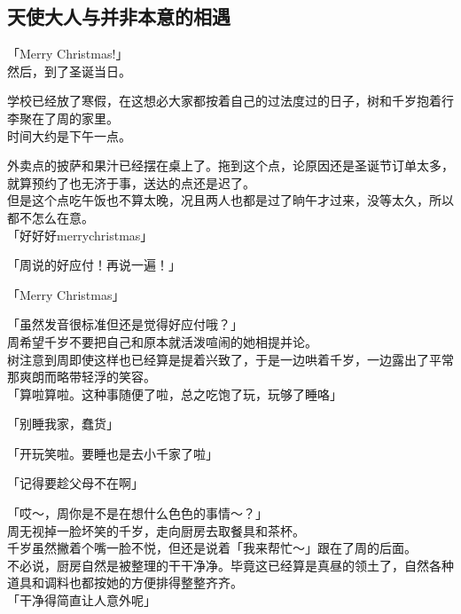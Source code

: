 \subsection{天使大人与并非本意的相遇}

「Merry Christmas!」\\

然后，到了圣诞当日。

学校已经放了寒假，在这想必大家都按着自己的过法度过的日子，树和千岁抱着行李聚在了周的家里。\\

时间大约是下午一点。

外卖点的披萨和果汁已经摆在桌上了。拖到这个点，论原因还是圣诞节订单太多，就算预约了也无济于事，送达的点还是迟了。\\

但是这个点吃午饭也不算太晚，况且两人也都是过了晌午才过来，没等太久，所以都不怎么在意。\\

「好好好merrychristmas」

「周说的好应付！再说一遍！」

「Merry Christmas」

「虽然发音很标准但还是觉得好应付哦？」\\

周希望千岁不要把自己和原本就活泼喧闹的她相提并论。\\

树注意到周即使这样也已经算是提着兴致了，于是一边哄着千岁，一边露出了平常那爽朗而略带轻浮的笑容。\\

「算啦算啦。这种事随便了啦，总之吃饱了玩，玩够了睡咯」

「别睡我家，蠢货」

「开玩笑啦。要睡也是去小千家了啦」

「记得要趁父母不在啊」

「哎～，周你是不是在想什么色色的事情～？」\\

周无视掉一脸坏笑的千岁，走向厨房去取餐具和茶杯。\\

千岁虽然撇着个嘴一脸不悦，但还是说着「我来帮忙～」跟在了周的后面。\\

不必说，厨房自然是被整理的干干净净。毕竟这已经算是真昼的领土了，自然各种道具和调料也都按她的方便排得整整齐齐。\\

「干净得简直让人意外呢」

